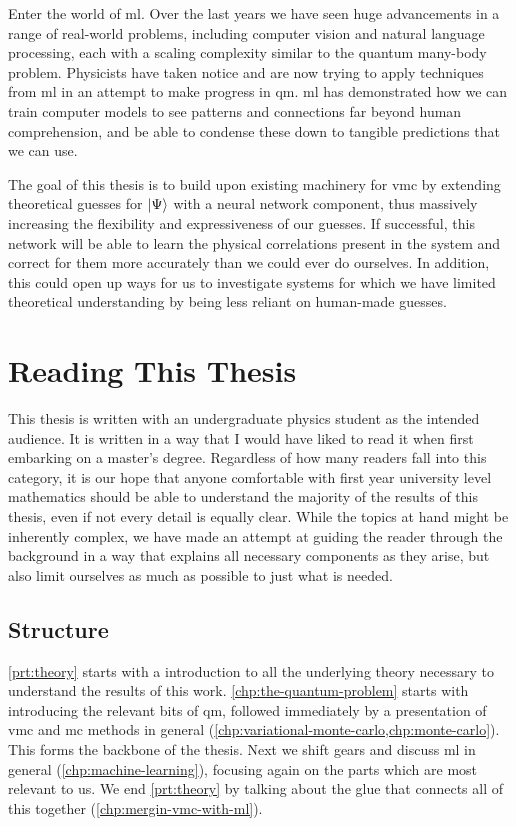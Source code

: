 \documentclass[Thesis.tex]{subfiles}
\begin{document}
Enter the world of \gls{ml}. Over the last years we have seen
huge advancements in a range of real-world problems, including computer vision and
natural language processing, each with a scaling complexity similar to
the quantum many-body problem.
Physicists have taken notice and are now trying
to apply techniques from \gls{ml} in an attempt to make progress in \gls{qm}. \Acrlong{ml} has
demonstrated how we can train computer models to see patterns and connections
far beyond human comprehension, and be able to condense these down to tangible
predictions that we can use.

The goal of this thesis is to build upon existing machinery for \gls{vmc} by extending
theoretical guesses for $| \Psi \rangle$ with a neural network component, thus massively
increasing the flexibility and expressiveness of our guesses. If successful, this
network will be able to learn the physical correlations present in the system
and correct for them more accurately than we could ever do ourselves. In
addition, this could open up ways for us to investigate systems for which we
have limited theoretical understanding by being less reliant on human-made guesses.


\section*{Reading This Thesis}

This thesis is written with an undergraduate physics student as the intended
audience. It is written in a way that I would have liked to read it when first
embarking on a master's degree. Regardless of how many readers fall into this
category, it is our hope that anyone comfortable with first year university
level mathematics should be able to understand the majority of the results of this
thesis, even if not every detail is equally clear. While the topics at hand might be
inherently complex, we have made an attempt at guiding the reader through the
background in a way that explains all necessary components as they arise, but
also limit ourselves as much as possible to just what is needed.


\subsection*{Structure}
\cref{prt:theory} starts with a introduction to all the underlying theory
necessary to understand the results of this work. \cref{chp:the-quantum-problem}
starts with introducing the relevant bits of \acrlong{qm}, followed
immediately by a presentation of \acrlong{vmc} and \acrlong{mc} methods
in general (\cref{chp:variational-monte-carlo,chp:monte-carlo}). This forms the
backbone of the thesis. Next we shift gears and discuss \acrlong{ml} in
general (\cref{chp:machine-learning}), focusing again on the parts which are
most relevant to us. We end \cref{prt:theory} by talking about the glue that
connects all of this together (\cref{chp:mergin-vmc-with-ml}).
\end{document}
